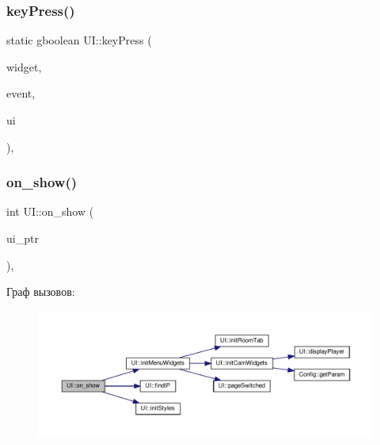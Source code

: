 \mbox{\label{class_u_i_ab9db8fde45ae6595a956feab77aaf2ca}} 
\subsubsection{\texorpdfstring{key\+Press()}{keyPress()}\hspace{0.1cm}{\footnotesize\ttfamily [2/2]}}
{\footnotesize\ttfamily static gboolean U\+I\+::key\+Press (\begin{DoxyParamCaption}\item[{Gtk\+Widget $\ast$}]{widget,  }\item[{Gdk\+Event\+Key $\ast$}]{event,  }\item[{\hyperlink{class_u_i}{UI} $\ast$}]{ui }\end{DoxyParamCaption})\hspace{0.3cm}{\ttfamily [static]}, {\ttfamily [private]}}

\mbox{\label{class_u_i_a405d8c6cbfea57303917867587e7e523}} 
\subsubsection{\texorpdfstring{on\+\_\+show()}{on\_show()}}
{\footnotesize\ttfamily int U\+I\+::on\+\_\+show (\begin{DoxyParamCaption}\item[{gpointer}]{ui\+\_\+ptr }\end{DoxyParamCaption})\hspace{0.3cm}{\ttfamily [static]}, {\ttfamily [private]}}

Граф вызовов\+:\nopagebreak
\begin{figure}[H]
\begin{center}
\leavevmode
\includegraphics[width=350pt]{class_u_i_a405d8c6cbfea57303917867587e7e523_cgraph}
\end{center}
\end{figure}
\mbox{\label{class_u_i_a4d6fc1c395de1396c3b4c17f60ce53f9}} 
